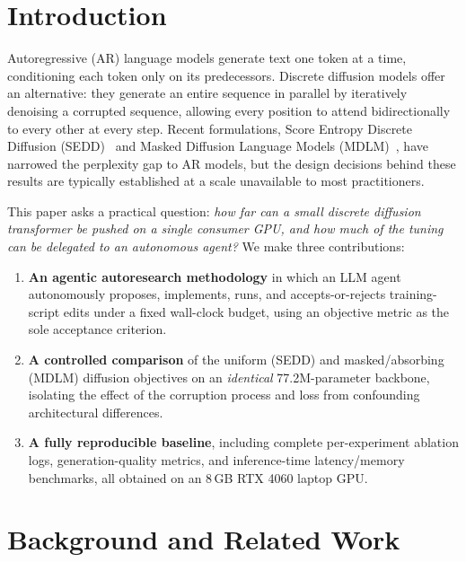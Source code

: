 \documentclass[conference]{IEEEtran}
\begin{document}
\section{Introduction}
Autoregressive (AR) language models generate text one token at a time,
conditioning each token only on its predecessors. Discrete diffusion
models offer an alternative: they generate an entire sequence in
parallel by iteratively denoising a corrupted sequence, allowing every
position to attend bidirectionally to every other at every step. Recent
formulations, Score Entropy Discrete Diffusion (SEDD)~\cite{sedd} and
Masked Diffusion Language Models (MDLM)~\cite{mdlm}, have narrowed the
perplexity gap to AR models, but the design decisions behind these
results are typically established at a scale unavailable to most
practitioners.

This paper asks a practical question: \emph{how far can a small discrete
diffusion transformer be pushed on a single consumer GPU, and how much
of the tuning can be delegated to an autonomous agent?} We make three
contributions:

\begin{enumerate}
\item \textbf{An agentic autoresearch methodology} in which an LLM agent
autonomously proposes, implements, runs, and accepts-or-rejects
training-script edits under a fixed wall-clock budget, using an
objective metric as the sole acceptance criterion.
\item \textbf{A controlled comparison} of the uniform (SEDD) and
masked/absorbing (MDLM) diffusion objectives on an \emph{identical}
77.2M-parameter backbone, isolating the effect of the corruption process
and loss from confounding architectural differences.
\item \textbf{A fully reproducible baseline}, including complete
per-experiment ablation logs, generation-quality metrics, and
inference-time latency/memory benchmarks, all obtained on an 8\,GB RTX
4060 laptop GPU.
\end{enumerate}

\section{Background and Related Work}
\end{document}
